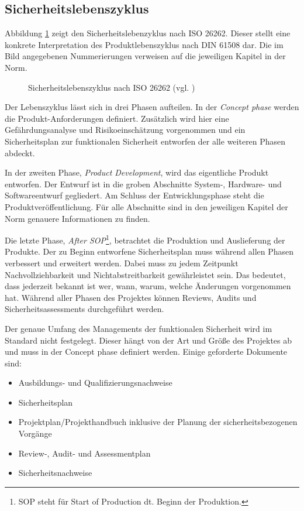 \documentclass[
  a4paper,					    %
  twoside,
  DIV=calc,     				%
  bibliography=totoc,
  cleardoublepage=empty,
  ngerman,     					%
  final       					%
]{scrbook}
\begin{document}
\subsection{Sicherheitslebenszyklus}
\label{sec:ISO26262_lebenszyklus}

Abbildung \ref{fig:lifecycle} zeigt den Sicherheitslebenzyklus nach ISO 26262. Dieser stellt eine konkrete Interpretation des Produktlebenszyklus nach DIN 61508 dar. Die im Bild angegebenen Nummerierungen verweisen auf die jeweiligen Kapitel in der Norm. 

\begin{figure}[!htbp]
    \center
    
    \caption[Sicherheitslebenszyklus nach ISO 26262]{Sicherheitslebenszyklus nach ISO 26262 (vgl. \cite{iso26262})}
    \label{fig:lifecycle}
\end{figure}

Der Lebenszyklus lässt sich in drei Phasen aufteilen. In der \emph{Concept phase} werden die Produkt-Anforderungen definiert. Zusätzlich wird hier eine Gefährdungsanalyse und Risikoeinschätzung vorgenommen und ein Sicherheitsplan zur funktionalen Sicherheit entworfen der alle weiteren Phasen abdeckt.

In der zweiten Phase, \emph{Product Development}, wird das eigentliche Produkt entworfen. Der Entwurf ist in die groben Abschnitte System-, Hardware- und Softwareentwurf gegliedert. Am Schluss der Entwicklungsphase steht die Produktveröffentlichung. Für alle Abschnitte sind in den jeweiligen Kapitel der Norm genauere Informationen zu finden.

Die letzte Phase, \emph{After SOP}\footnote{SOP steht für Start of Production dt. Beginn der Produktion.}, betrachtet die Produktion und Auslieferung der Produkte. Der zu Beginn entworfene Sicherheitsplan muss während allen Phasen verbessert und erweitert werden. Dabei muss zu jedem Zeitpunkt Nachvollziehbarkeit und Nichtabstreitbarkeit gewährleistet sein. Das bedeutet, dass jederzeit bekannt ist wer, wann, warum, welche Änderungen vorgenommen hat. Während aller Phasen des Projektes können Reviews, Audits und Sicherheitsassessments durchgeführt werden.

Der genaue Umfang des Managements der funktionalen Sicherheit wird im Standard nicht festgelegt. Dieser hängt von der Art und Größe des Projektes ab und muss in der Concept phase definiert werden. Einige geforderte Dokumente sind:

\begin{itemize}
    \item Ausbildungs- und Qualifizierungsnachweise
    \item Sicherheitsplan
    \item Projektplan/Projekthandbuch inklusive der Planung der sicherheitsbezogenen Vorgänge
    \item Review-, Audit- und Assessmentplan
    \item Sicherheitsnachweise
\end{itemize}
\end{document}
